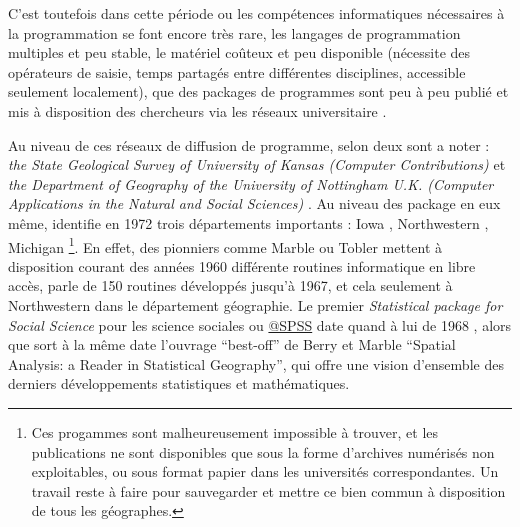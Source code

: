 C'est toutefois dans cette période ou les compétences informatiques nécessaires à la programmation se font encore très rare, les langages de programmation multiples et peu stable, le matériel coûteux et peu disponible (nécessite des opérateurs de saisie, temps partagés entre différentes disciplines, accessible seulement localement), que des packages de programmes sont peu à peu publié et mis à disposition des chercheurs via les réseaux universitaire \autocite{Haggett1969}. 

Au niveau de ces réseaux de diffusion de programme, selon \textcite[20-21]{Greer1972} deux sont a noter : \textit{the State Geological Survey of University of Kansas (Computer Contributions)}  et \textit{ the Department of Geography of the University of Nottingham U.K. (Computer Applications in the Natural and Social Sciences) }. Au niveau des package en eux même, \textcite[20-21]{Greer1972} identifie en 1972 trois départements importants : Iowa \autocite{Wittick1968}, Northwestern \autocite{Marble1967}, Michigan \autocite{Tobler1970c}\footnote{Ces progammes sont malheureusement impossible à trouver, et les publications ne sont disponibles que sous la forme d'archives numérisés non exploitables, ou sous format papier dans les universités correspondantes. Un travail reste à faire pour sauvegarder et mettre ce bien commun à disposition de tous les géographes.}. En effet, des pionniers comme Marble ou Tobler mettent à disposition courant des années 1960 différente routines informatique en libre accès, \textcite[3]{Marble1967} parle de 150 routines développés jusqu'à 1967, et cela seulement à Northwestern dans le département géographie. Le premier \textit{Statistical package for Social Science} pour les science sociales ou \href{http://en.wikipedia.org/wiki/SPSS}{@SPSS} date quand à lui de 1968 \autocite{Barnes2011}, alors que sort à la même date l'ouvrage \foreignquote{english}{best-off} de Berry et Marble \foreignquote{english}{Spatial Analysis: a Reader in Statistical Geography}, qui offre une vision d'ensemble des derniers développements statistiques et mathématiques.


